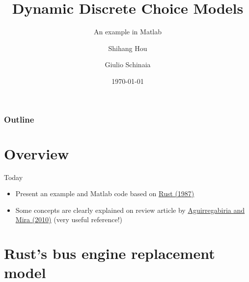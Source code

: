 \documentclass[aspectratio=169]{beamer}
\title{Dynamic Discrete Choice Models}
\subtitle{An example in Matlab}
\author{
	Shihang Hou
	\and 
	Giulio Schinaia
}
\institute{University of Oxford}
\date{\today}
\begin{document}
	\begin{frame}
		\titlepage
	\end{frame}
	
	\begin{frame}
		\frametitle{Outline}
		\tableofcontents
	\end{frame}
	
	\section{Overview}
	
	\begin{frame}{Today}
		\begin{itemize}
			\itemsep1em
			\item Present an example and Matlab code based on \href{https://www.dropbox.com/s/5wn4yj16uhd8s4r/Rust_Optimal\%20Replacement\%20of\%20GMC\%20Bus\%20Engines\%20An\%20Empirical\%20Model\%20of\%20Harold\%20Zurcher_ECMA_1987.pdf?dl=0P}{Rust (1987)}
			\pause
			\item Some concepts are clearly explained on review article by \href{https://www.dropbox.com/s/zvsldc5pmoy1597/Aguirregabiria\%2C\%20Mira_2010_Dynamic\%20discrete\%20choice\%20structural\%20models\%20A\%20survey.pdf?dl=0}{Aguirregabiria and Mira (2010)} (very useful reference!)
		\end{itemize}
	\end{frame}
	
	
	\section{Rust's bus engine replacement model}
	
\end{document}
